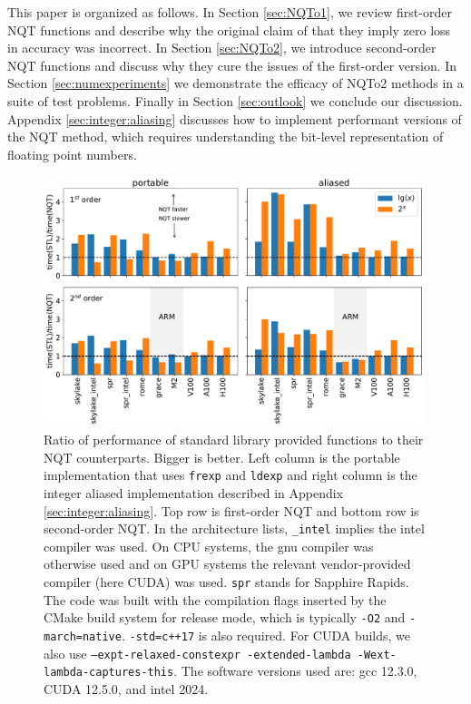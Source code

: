 \documentclass[linenumbers,twocolumn]{aastex631}
\newcommand{\mynote}[3]{
  \textcolor{#2}{\fbox{\bfseries\sffamily\scriptsize#1}}
    {\small$\blacktriangleright$\textsf{\emph{#3}}$\blacktriangleleft$}
}
\newcommand{\jf}[1]{\mynote{JF}{green}{#1}}
\newcommand{\jmm}[1]{\mynote{JMM}{blue}{#1}}
\begin{document}
This paper is organized as follows. In Section \ref{sec:NQTo1}, we review first-order NQT functions and describe why the original claim of \citet{NQTo1} that they imply zero loss in accuracy was incorrect. In Section \ref{sec:NQTo2}, we introduce second-order NQT functions and discuss why they cure the issues of the first-order version. In Section \ref{sec:numexperiments} we demonstrate the efficacy of NQTo2 methods in a suite of test problems. Finally in Section \ref{sec:outlook} we conclude our discussion. Appendix \ref{sec:integer:aliasing} discusses how to implement performant versions of the NQT method, which requires understanding the bit-level representation of floating point numbers.

\begin{nolinenumbers}
\begin{figure}[tb]
    \centering
    \includegraphics[width=0.99\textwidth]{figures/nqt_speedups.pdf}
    \caption{Ratio of performance of standard library provided functions to their NQT counterparts. Bigger is better. Left column is the portable implementation that uses {\tt frexp} and {\tt ldexp} and right column is the integer aliased implementation described in Appendix \ref{sec:integer:aliasing}. Top row is first-order NQT and bottom row is second-order NQT. In the architecture lists, {\tt \_intel} implies the intel compiler was used. On CPU systems, the gnu compiler was otherwise used and on GPU systems the relevant vendor-provided compiler (here CUDA) was used. {\tt spr} stands for Sapphire Rapids. The code was built with the compilation flags inserted by the CMake build system for release mode, which is typically {\tt -O2} and {\tt -march=native}. {\tt -std=c++17} is also required. For CUDA builds, we also use {\tt --expt-relaxed-constexpr -extended-lambda -Wext-lambda-captures-this}. The software versions used are: gcc 12.3.0, CUDA 12.5.0, and intel 2024.}
    \label{fig:NQT:comp}
\end{figure}
\end{nolinenumbers}
\end{document}
